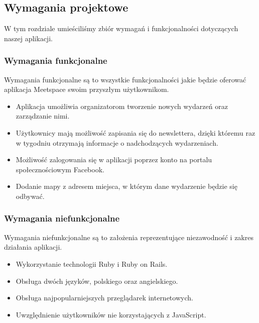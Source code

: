 

\subsection{Wymagania projektowe}
W tym rozdziale umieściliśmy zbiór wymagań i funkcjonalności dotyczących naszej aplikacji.
  \subsubsection{Wymagania funkcjonalne}
    Wymagania funkcjonalne są to wszystkie funkcjonalności jakie będzie oferować aplikacja Meetspace swoim przyszłym użytkownikom.
    \begin{itemize}
      \item Aplikacja umożliwia organizatorom tworzenie nowych wydarzeń oraz zarządzanie nimi.
      \item Użytkownicy mają możliwość zapisania się do newslettera, dzięki któremu raz w tygodniu otrzymają informacje o nadchodzących wydarzeniach.
      \item Możliwość zalogowania się w aplikacji poprzez konto na portalu społecznościowym Facebook.
      \item Dodanie mapy z adresem miejsca, w którym dane wydarzenie będzie się odbywać.
    \end{itemize}
  \subsubsection{Wymagania niefunkcjonalne}
  Wymagania niefunkcjonalne są to założenia reprezentujące niezawodność i zakres działania aplikacji.
    \begin{itemize}
      \item Wykorzystanie technologii Ruby i Ruby on Rails.
      \item Obsługa dwóch języków, polskiego oraz angielskiego.
      \item Obsługa najpopularniejszych przeglądarek internetowych.
      \item Uwzględnienie użytkowników nie korzystających z JavaScript.
    \end{itemize}

